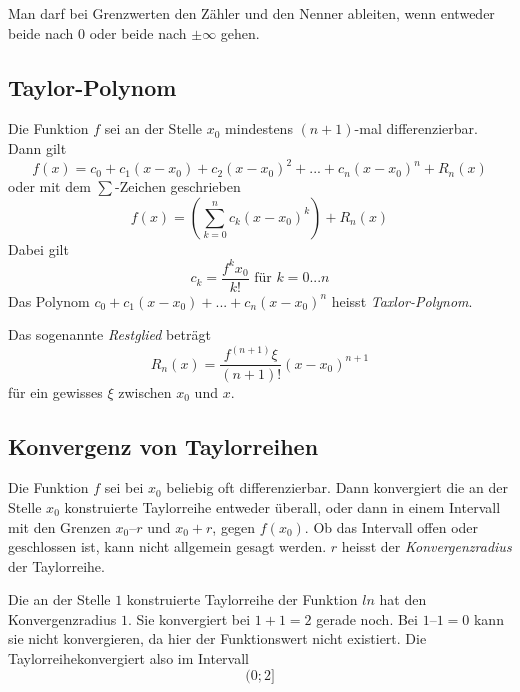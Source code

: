 \documentclass[10pt,a4paper]{article}
\begin{document}
Man darf bei Grenzwerten den Zähler und den Nenner ableiten, wenn entweder beide nach $0$ oder beide nach $\pm \infty$ gehen.


\subsection{Taylor-Polynom}

Die Funktion $f$ sei an der Stelle $x_0$ mindestens $(n + 1)$-mal differenzierbar. Dann gilt
$$f(x) = c_0 + c_1(x-x_0) + c_2(x-x_0)^2 + ... + c_n(x-x_0)^n + R_n(x)$$
oder mit dem $\sum$-Zeichen geschrieben
$$f(x) = \left(\sum_{k=0}^n c_k(x-x_0)^k\right) + R_n(x)$$
Dabei gilt
$$c_k = \frac{f^kx_0}{k!}\textrm{ für }k=0...n$$
Das Polynom $c_0 + c_1(x-x_0)+...+c_n(x-x_0)^n$ heisst \textit{Taxlor-Polynom}.

Das sogenannte \textit{Restglied} beträgt
$$R_n(x) = \frac{f^{(n+1)}\xi}{(n+1)!}(x-x_0)^{n+1}$$
für ein gewisses $\xi$ zwischen $x_0$ und $x$.


\subsection{Konvergenz von Taylorreihen}

Die Funktion $f$ sei bei $x_0$ beliebig oft differenzierbar. Dann konvergiert die an der Stelle $x_0$ konstruierte Taylorreihe entweder überall, oder dann in einem Intervall mit den Grenzen $x_0 – r$ und $x_0 + r$, gegen $f(x_0)$. Ob das Intervall offen oder geschlossen ist, kann nicht allgemein gesagt werden. $r$ heisst der \textit{Konvergenzradius} der Taylorreihe.

Die an der Stelle $1$ konstruierte Taylorreihe der Funktion $ln$ hat den Konvergenzradius $1$. Sie konvergiert bei $1 + 1 = 2$ gerade noch. Bei $1 – 1 = 0$ kann sie nicht konvergieren, da hier der Funktionswert nicht existiert. Die Taylorreihekonvergiert also im Intervall $$(0;2]$$
\end{document}
